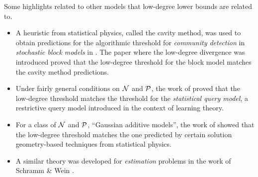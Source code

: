 \documentclass[11pt, letterpaper]{article}
\newcommand{\Null}{\calN}
\newcommand{\Planted}{\calP}
\begin{document}

Some highlights related to other models that low-degree lower bounds are related to.
\begin{itemize}
    \item A heuristic from statistical physics, called the cavity method, was used to obtain predictions for the algorithmic threshold for \emph{community detection} in \emph{stochastic block models} in \cite{DKMZ11}.
    The paper where the low-degree divergence was introduced \cite{HS17} proved that the low-degree threshold for the block model matches the cavity method predictions.
    \item Under fairly general conditions on $\Null$ and $\Planted$, the work of \cite{BBHLS20} proved that the low-degree threshold matches the threshold for the \emph{statistical query model}, a restrictive query model introduced in the context of learning theory.
    \item For a class of $\Null$ and $\Planted$, ``Gaussian additive models'', the work of \cite{BEHSWZ22} showed that the low-degree threshold matches the one predicted by certain solution geometry-based techniques from statistical physics.
    \item A similar theory was developed for \emph{estimation} problems in the work of Schramm \& Wein \cite{SW22}.
\end{itemize}




\end{document}
